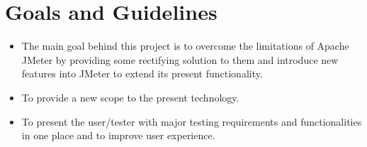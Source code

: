 \documentclass[12pt]{book}
\begin{document}
\section{Goals and Guidelines}
\begin{itemize}
 \item The main goal behind this project is to overcome the limitations of Apache JMeter by providing some rectifying solution to them 
      and introduce new features into JMeter to extend its present functionality.
 \item To provide a new scope to the present technology.
 \item To present the user/tester with major testing requirements and functionalities in one
      place and to improve user experience.
\end{itemize}
\end{document}
